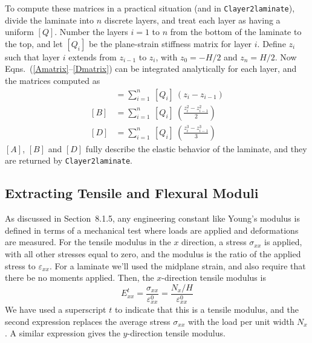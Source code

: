 \documentclass[11pt]{article}
\begin{document}
To compute these matrices in a practical situation (and in \texttt{Clayer2laminate}), divide the laminate into $n$ discrete layers, and treat each layer as having a uniform $[Q]$.  Number the layers $i = 1$ to $n$ from the bottom of the laminate to the top, and let $[Q_i]$ be the plane-strain stiffness matrix for layer $i$.  Define $z_i$ such that layer $i$ extends from $z_{i-1}$ to $z_{i}$, with $z_0 = -H/2$ and $z_n = H/2$.  Now Eqns.~(\ref{Amatrix}--\ref{Dmatrix}) can be integrated analytically for each layer, and the matrices computed as
\begin{align}
     [A] &= \sum_{i=1}^n \: [Q_i] \: \left( z_i - z_{i-1} \right)  \label{Asum} \\
     [B] &= \sum_{i=1}^n  \: [Q_i] \: \left( \frac{z^2_i - z^2_{i-1}}{2} \right)  \label{Bsum}  \\
     [D] &= \sum_{i=1}^n  \: [Q_i] \: \left( \frac{z^3_i - z^3_{i-1}}{3} \right)  \label{Dsum}
\end{align}
$[A]$, $[B]$ and $[D]$ fully describe the elastic behavior of the laminate, and they are returned by \texttt{Clayer2laminate}.  

\subsection*{Extracting Tensile and Flexural Moduli}

As discussed in Section~8.1.5, any engineering constant like Young's modulus is defined in terms of a mechanical test where loads are applied and deformations are measured.  For the tensile modulus in the $x$ direction, a stress $\sigma_{xx}$ is applied, with all other stresses equal to zero, and the modulus is the ratio of the applied stress to $\varepsilon_{xx}$.  For a laminate we'll used the midplane strain, and also require that there be no moments applied.  Then, the $x$-direction tensile modulus is
\begin{equation}
    E^t_{xx} = \frac{\sigma_{xx}}{\varepsilon^0_{xx}}   = \frac{N_{x}/H}{\varepsilon^0_{xx}} 
    \label{EtensileDef}
 \end{equation}
We have used a superscript $t$ to indicate that this is a tensile modulus, and the second expression replaces the average stress $\sigma_{xx}$ with the load per unit width $N_x$.  A similar expression gives the $y$-direction tensile modulus.
\end{document}

